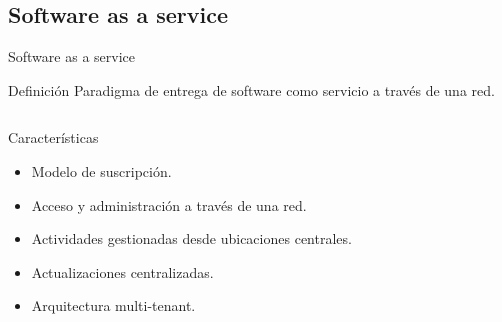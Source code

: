 \documentclass[10pt,xcolor=table ]{beamer}
\begin{document}
\subsection{Software as a service}
\begin{frame}{Software as a service}
	\begin{alertblock}{Definición}
		Paradigma de entrega de software como servicio a través de una red.
	\end{alertblock}

	\begin{columns}[c,onlytextwidth]
		\begin{block}{Características}
			\begin{itemize}
	        	\item Modelo de suscripción.
	        	\item Acceso y administración a través de una red.
	        	\item Actividades gestionadas desde ubicaciones centrales.
	        	\item Actualizaciones centralizadas.
	      		\item Arquitectura multi-tenant.
	    	\end{itemize}
		\end{block}
		\begin{figure}[H]

\end{figure}
\end{columns}
\end{frame}
\end{document}
